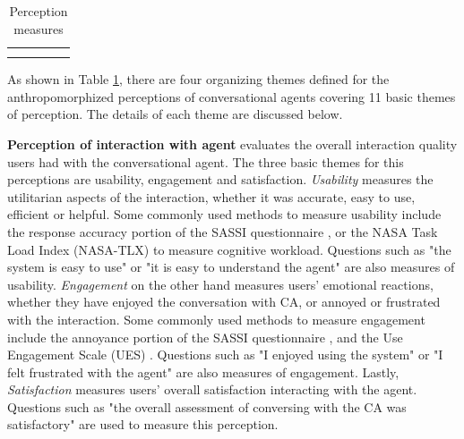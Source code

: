 \documentclass[sigconf,screen,review, anonymous]{acmart}
\newcommand{\cmt}[1]{}%
\begin{document}
\begin{table}[ht]
{\begin{tabular}{@{}p{3.1cm} | p{2cm} | p{4cm} | p{1.5cm} | p{6cm} @{}}
    \cite{ceha2022expressive}\cmt{[77]}
    \cite{ceha2021can}\cmt{[57]}
    \cite{chan2021kinvoices}\cmt{[74]}
    \cite{cox2022does}\cmt{[27]}
    \cite{cuadra2021my}\cmt{[67]}
    \cite{haas2022keep}\cmt{[78]}
    \cite{habler2019effects}\cmt{[63]}
    \cite{healey2013relating}\cmt{[39]}
    \cite{hu2022polite}\cmt{[76]}
    \cite{huiyang2022improving}\cmt{[17]}
    \cite{jeong2019exploring}\cmt{[10]}
    \cite{jestin2022effects}\cmt{[81]}
    \cite{khooshabeh2011does}\cmt{[37]}
    \cite{kim2019comparing}\cmt{[89]}
    \cite{lee2019s}\cmt{[55]}
    \cite{lee2020hear}\cmt{[23]}
    \cite{linnemann2018can}\cmt{[15]}
    \cite{miehle2018exploring}\cmt{[51]}
    \cite{moilanen2022measuring}\cmt{[82]}
    \cite{ouchi2019should}\cmt{[59]}
    \cite{tolmeijer2021female}\cmt{[62]}
    \cite{volkel2021manipulating}\cmt{[68]}
    \cite{volkel2022user}\cmt{[75]}
    \cite{wester2015artificial}\cmt{[14]}
    \cite{zhu2022effects}\cmt{[26]} 
\\ \Xhline{1.2pt}
\end{tabular}%
}
\caption{Perception measures}
\label{tab:perceptions}
\end{table}

As shown in Table \ref{tab:perceptions}, there are four organizing themes defined for the anthropomorphized perceptions of conversational agents covering 11 basic themes of perception. The details of each theme are discussed below.

\textbf{Perception of interaction with agent} evaluates the overall interaction quality users had with the conversational agent. The three basic themes for this perceptions are usability, engagement and satisfaction. \textit{Usability} measures the utilitarian aspects of the interaction, whether it was accurate, easy to use, efficient or helpful. Some commonly used methods to measure usability include the response accuracy portion of the SASSI questionnaire \cite{hone2000towards}\cmt{sassi}, or the NASA Task Load Index (NASA-TLX) \cite{hart1988development}\cmt{nasa} to measure cognitive workload. Questions such as "the system is easy to use" or "it is easy to understand the agent" are also measures of usability. \textit{Engagement} on the other hand measures users' emotional reactions, whether they have enjoyed the conversation with CA, or annoyed or frustrated with the interaction. Some commonly used methods to measure engagement include  the annoyance portion of the SASSI questionnaire \cite{hone2000towards}\cmt{sassi}, and the Use Engagement Scale (UES) \cite{o2018practical}\cmt{ues}. Questions such as "I enjoyed using the system" or "I felt frustrated with the agent" are also measures of engagement. Lastly, \textit{Satisfaction} measures users' overall satisfaction interacting with the agent. Questions such as "the overall assessment of conversing with the CA was satisfactory" are used to measure this perception.
\end{document}

